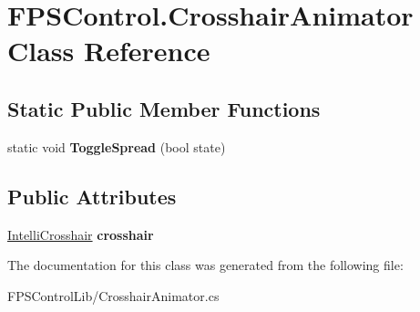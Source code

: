 \hypertarget{class_f_p_s_control_1_1_crosshair_animator}{\section{F\-P\-S\-Control.\-Crosshair\-Animator Class Reference}
\label{class_f_p_s_control_1_1_crosshair_animator}
}
\subsection*{Static Public Member Functions}
\begin{DoxyCompactItemize}
\item 
\hypertarget{class_f_p_s_control_1_1_crosshair_animator_a2ad4de22f2cee13349cb9c2446fc228a}{static void {\bfseries Toggle\-Spread} (bool state)}\label{class_f_p_s_control_1_1_crosshair_animator_a2ad4de22f2cee13349cb9c2446fc228a}

\end{DoxyCompactItemize}
\subsection*{Public Attributes}
\begin{DoxyCompactItemize}
\item 
\hypertarget{class_f_p_s_control_1_1_crosshair_animator_a400945f2e5e8de9e473cdca352c2dead}{\hyperlink{class_f_p_s_control_1_1_intelli_crosshair}{Intelli\-Crosshair} {\bfseries crosshair}}\label{class_f_p_s_control_1_1_crosshair_animator_a400945f2e5e8de9e473cdca352c2dead}

\end{DoxyCompactItemize}


The documentation for this class was generated from the following file\-:\begin{DoxyCompactItemize}
\item 
F\-P\-S\-Control\-Lib/Crosshair\-Animator.\-cs\end{DoxyCompactItemize}
